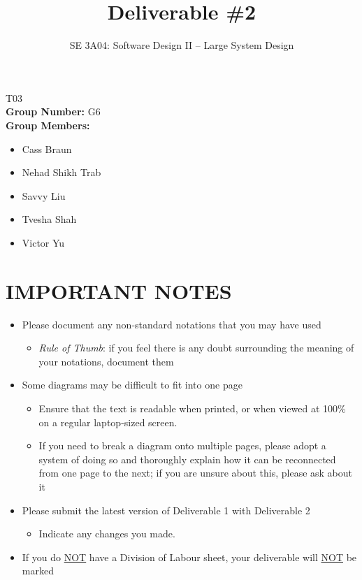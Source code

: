 \documentclass[]{article}
\title{Deliverable \#2}
\author{SE 3A04: Software Design II -- Large System Design}
\date{}
\begin{document}
\maketitle	
{} T03\\
{\bf Group Number:} G6 \\
{\bf Group Members:} 
\begin{itemize}
	\item Cass Braun
	\item Nehad Shikh Trab
	\item Savvy Liu
	\item Tvesha Shah
	\item Victor Yu
\end{itemize}

\section*{IMPORTANT NOTES}
\begin{itemize}
	\item Please document any non-standard notations that you may have used
	\begin{itemize}
		\item \emph{Rule of Thumb}: if you feel there is any doubt surrounding the meaning of your notations, document them
	\end{itemize}
	\item Some diagrams may be difficult to fit into one page
	\begin{itemize}
		\item Ensure that the text is readable when printed, or when viewed at 100\% on a regular laptop-sized screen.
		\item If you need to break a diagram onto multiple pages, please adopt a system of doing so and thoroughly explain how it can be reconnected from one page to the next; if you are unsure about this, please ask about it
	\end{itemize}
	\item Please submit the latest version of Deliverable 1 with Deliverable 2
	\begin{itemize}
		\item Indicate any changes you made.
	\end{itemize}
	\item If you do \underline{NOT} have a Division of Labour sheet, your deliverable will \underline{NOT} be marked
\end{itemize}
\end{document}
